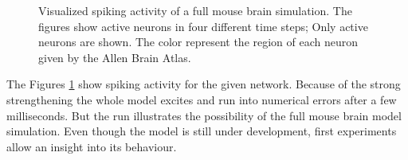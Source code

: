 \begin{figure}[ht!]
\begin{center}
{		}
    \end{center}
    \caption{%
        Visualized spiking activity of a full mouse brain simulation.
        The figures show active neurons in four different time steps;
        Only active neurons are shown.
        The color represent the region of each neuron given by the Allen Brain Atlas.
     }%
   \label{fig:sim}
\end{figure}
The Figures \ref{fig:sim} show spiking activity for the given network.
Because of the strong strengthening the whole model excites and run into numerical errors
after a few milliseconds. But the run illustrates the possibility of the full mouse brain model
simulation. Even though the model is still under development, first experiments allow an insight 
into its behaviour.


